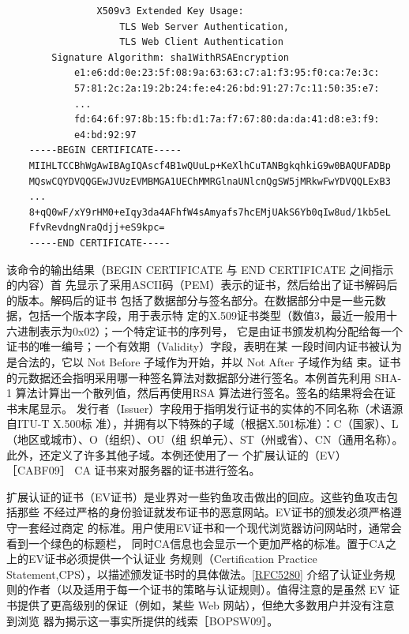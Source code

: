 \begin{verbatim}
                X509v3 Extended Key Usage:
                    TLS Web Server Authentication,
                    TLS Web Client Authentication
        Signature Algorithm: sha1WithRSAEncryption
            e1:e6:dd:0e:23:5f:08:9a:63:63:c7:a1:f3:95:f0:ca:7e:3c:
            57:81:2c:2a:19:2b:24:fe:e4:26:bd:91:27:7c:11:50:35:e7:
            ...
            fd:64:6f:97:8b:15:fb:d1:7a:f7:67:80:da:da:41:d8:e3:f9:
            e4:bd:92:97
    -----BEGIN CERTIFICATE-----
    MIIHLTCCBhWgAwIBAgIQAscf4B1wQUuLp+KeXlhCuTANBgkqhkiG9w0BAQUFADBp
    MQswCQYDVQQGEwJVUzEVMBMGA1UEChMMRGlnaUNlcnQgSW5jMRkwFwYDVQQLExB3
    ...
    8+qQ0wF/xY9rHM0+eIqy3da4AFhfW4sAmyafs7hcEMjUAkS6Yb0qIw8ud/1kb5eL
    FfvRevdngNraQdjj+eS9kpc=
    -----END CERTIFICATE-----
\end{verbatim}
该命令的输出结果（BEGIN CERTIFICATE 与 END CERTIFICATE 之间指示的内容）首
先显示了采用ASCII码（PEM）表示的证书，然后给出了证书解码后的版本。解码后的证书
包括了数据部分与签名部分。在数据部分中是一些元数据，包括一个版本字段，用于表示特
定的X.509证书类型（数值3，最近一般用十六进制表示为0x02）；一个特定证书的序列号，
它是由证书颁发机构分配给每一个证书的唯一编号；一个有效期（Validity）字段，表明在某
一段时间内证书被认为是合法的，它以 Not Before 子域作为开始，并以 Not After 子域作为结
束。证书的元数据还会指明采用哪一种签名算法对数据部分进行签名。本例首先利用 SHA-1
算法计算出一个散列值，然后再使用RSA 算法进行签名。签名的结果将会在证书末尾显示。
发行者（Issuer）字段用于指明发行证书的实体的不同名称（术语源自ITU-T X.500标
准），并拥有以下特殊的子域（根据X.501标准）：C（国家）、L（地区或城市）、O（组织）、OU（组
织单元）、ST（州或省）、CN（通用名称）。此外，还定义了许多其他子域。本例还使用了一
个扩展认证的（EV）［CABF09］ CA 证书来对服务器的证书进行签名。

扩展认证的证书（EV证书）是业界对一些钓鱼攻击做出的回应。这些钓鱼攻击包括那些
不经过严格的身份验证就发布证书的恶意网站。EV证书的颁发必须严格遵守一套经过商定
的标准。用户使用EV证书和一个现代浏览器访问网站时，通常会看到一个绿色的标题栏，
同时CA信息也会显示一个更加严格的标准。置于CA之上的EV证书必须提供一个认证业
务规则（Certification Practice Statement,CPS），以描述颁发证书时的具体做法。\href{https://www.rfc-editor.org/rfc/rfc5280}{[RFC5280]}
介绍了认证业务规则的作者（以及适用于每一个证书的策略与认证规则）。值得注意的是虽然
EV 证书提供了更高级别的保证（例如，某些 Web 网站），但绝大多数用户并没有注意到浏览
器为揭示这一事实所提供的线索［BOPSW09］。

